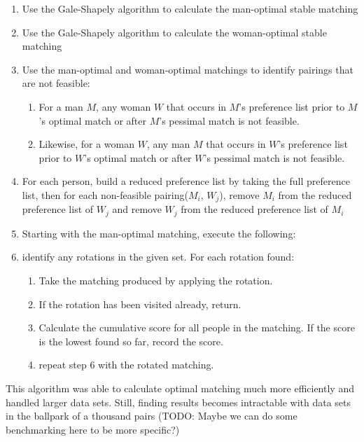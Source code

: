 \documentclass[a4paper]{article}
\begin{document}
\begin{enumerate}
    \item Use the Gale-Shapely algorithm to calculate the man-optimal stable matching
    
    \item Use the Gale-Shapely algorithm to calculate the woman-optimal stable matching
    
    \item Use the man-optimal and woman-optimal matchings to identify pairings that are not feasible:
    \begin{enumerate}
        \item For a man $M$, any woman $W$ that occurs in $M$'s preference list prior to $M$'s optimal match or after $M$'s pessimal match is not feasible.
        \item Likewise, for a woman $W$, any man $M$ that occurs in $W$'s preference list prior to $W$'s optimal match or after $W$'s pessimal match is not feasible.
    \end{enumerate}

    \item For each person, build a reduced preference list by taking the full preference list, then for each non-feasible pairing($M_i$, $W_j$), remove $M_i$ from the reduced preference list of $W_j$ and remove $W_j$ from the reduced preference list of $M_i$

    \item Starting with the man-optimal matching, execute the following:

    \item identify any rotations in the given set. For each rotation found:
    \begin{enumerate}
        \item Take the matching produced by applying the rotation.
        \item If the rotation has been visited already, return.
        \item Calculate the cumulative score for all people in the matching. If the score is the lowest found so far, record the score.
        \item repeat step 6 with the rotated matching.
    \end{enumerate}
\end{enumerate}

This algorithm was able to calculate optimal matching much more efficiently and handled larger data sets. Still, finding results becomes intractable with data sets in the ballpark of a thousand pairs (TODO: Maybe we can do some benchmarking here to be more specific?)
\end{document}
